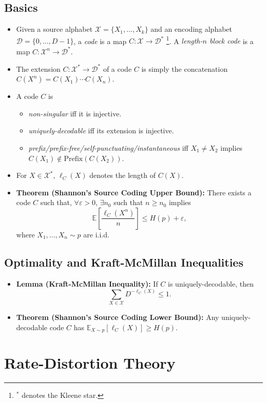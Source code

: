 \documentclass{article}
\newcommand{\e}{\varepsilon}                        %
\newcommand{\X}{\mathcal{X}}                        %
\newcommand{\E}{\mathbb{E}}                         %
\begin{document}
\subsection{Basics}
\begin{itemize}
\item Given a source alphabet $\X = \{X_1,\dots,X_k\}$ and an encoding alphabet
$\mathcal{D} = \{0,\dots,D - 1\}$, a \emph{code} is a map
$C : \X \to \mathcal{D}^*$ \footnote{$^*$ denotes the Kleene star.}. A
\emph{length-$n$ block code} is a map $C : \X^n \to \mathcal{D}^*$.
\item The extension $C : \X^* \to \mathcal{D}^*$ of a code $C$ is simply the
concatenation $C(X^n) = C(X_1) \cdots C(X_n)$.
\item A code $C$ is
\begin{itemize}
\item \emph{non-singular} iff it is injective.
\item \emph{uniquely-decodable} iff its extension is injective.
\item \emph{prefix/prefix-free/self-punctuating/instantaneous} iff
$X_1 \neq X_2$ implies $C(X_1) \notin \text{Prefix}(C(X_2))$.
\end{itemize}
\item For $X \in \X^*$, $\ell_C(X)$ denotes the length of $C(X)$.
\item {\bf Theorem (Shannon's Source Coding Upper Bound):} There exists a code
$C$ such that, $\forall \e > 0$, $\exists n_0$ such that $n \geq n_0$ implies
\[\E\left[ \frac{\ell_C(X^n)}{n} \right] \leq H(p) + \e,\]
where $X_1,\dots,X_n \sim p$ are i.i.d.
\end{itemize}
\subsection{Optimality and Kraft-McMillan Inequalities}
\begin{itemize}
\item {\bf Lemma (Kraft-McMillan Inequality):} If $C$ is uniquely-decodable,
then
\[\sum_{X \in \X} D^{-\ell_C(X)} \leq 1.\]
\item {\bf Theorem (Shannon's Source Coding Lower Bound):} Any
uniquely-decodable code $C$ has $\E_{X \sim p}[\ell_C(X)] \geq H(p)$.
\end{itemize}

\section{Rate-Distortion Theory}
\end{document}
